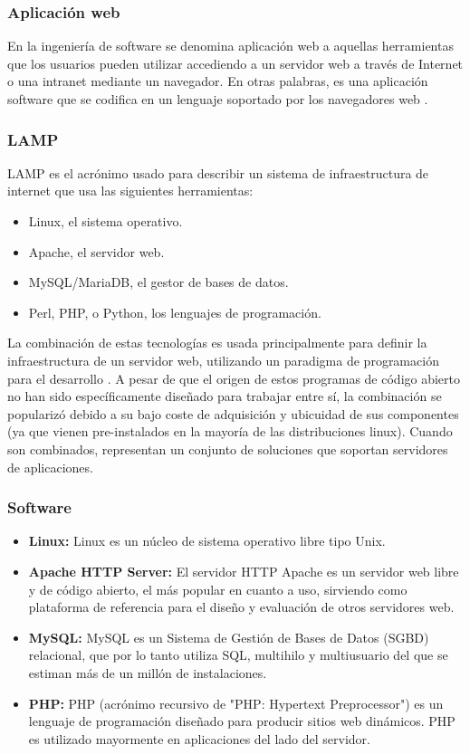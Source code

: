 \subsubsection{Aplicación web}
En la ingeniería de software se denomina aplicación web a aquellas herramientas que los usuarios pueden utilizar accediendo a un servidor web a través de Internet o una intranet mediante un navegador. En otras palabras, es una aplicación software que se codifica en un lenguaje soportado por los navegadores web \citep{mora}.

\subsubsection{LAMP}

LAMP es el acrónimo usado para describir un sistema de infraestructura de internet que usa las siguientes herramientas:

\begin{itemize}
	\item Linux, el sistema operativo.
	\item Apache, el servidor web.
	\item MySQL/MariaDB, el gestor de bases de datos.
	\item Perl, PHP, o Python, los lenguajes de programación. 
\end{itemize}

La combinación de estas tecnologías es usada principalmente para definir la infraestructura de un servidor web, utilizando un paradigma de programación para el desarrollo \citep{apache}.
\vskip 0.3cm
A pesar de que el origen de estos programas de código abierto no han sido específicamente diseñado para trabajar entre sí, la combinación se popularizó debido a su bajo coste de adquisición y ubicuidad de sus componentes (ya que vienen pre-instalados en la mayoría de las distribuciones linux). Cuando son combinados, representan un conjunto de soluciones que soportan servidores de aplicaciones.

\subsubsection{Software}

\begin{itemize}
	\item \textbf{Linux:} Linux es un núcleo de sistema operativo libre tipo Unix.
	\item \textbf{Apache HTTP Server:} El servidor HTTP Apache es un servidor web libre y de código abierto, el más popular en cuanto a uso, sirviendo como plataforma de referencia para el diseño y evaluación de otros servidores web.
	\item \textbf{MySQL:} MySQL es un Sistema de Gestión de Bases de Datos (SGBD) relacional, que por lo tanto utiliza SQL, multihilo y multiusuario del que se estiman más de un millón de instalaciones.
	\item \textbf{PHP:} PHP (acrónimo recursivo de "PHP: Hypertext Preprocessor") es un lenguaje de programación diseñado para producir sitios web dinámicos. PHP es utilizado mayormente en aplicaciones del lado del servidor.
\end{itemize}

